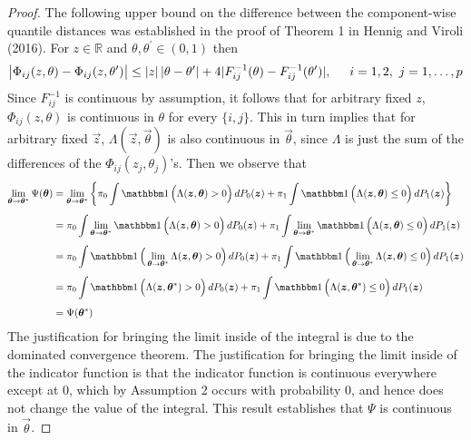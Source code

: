 \begin{proof}
  The following upper bound on the difference between the component-wise
  quantile distances was established in the proof of Theorem 1 in Hennig and
  Viroli (2016).  For $z \in \mathbb{R}$ and
  $\theta, \theta^{\prime} \in (0, 1)$ then
  \begin{equation}
    \label{eq:quantile-distance-ubnd}
    \big| \Phi_{ij}(z, \theta) - \Phi_{ij}(z, \theta^{\prime}) \big|
    \leq |z|\, | \theta - \theta^{\prime} | +
    4 | F_{ij}^{-1}(\theta) - F_{ij}^{-1}(\theta^{\prime}) |,
    \hspace{5mm} i = 1, 2,~ j = 1, \dots, p
  \end{equation}
  Since $F_{ij}^{-1}$ is continuous by assumption, it follows that for arbitrary
  fixed $z$, $\Phi_{ij}(z, \theta)$ is continuous in $\theta$ for every
  $\{i, j\}$.  This in turn implies that for arbitrary fixed $\vec{z}$,
  $\Lambda(\vec{z}, \vec{\theta})$ is also continuous in $\vec{\theta}$, since
  $\Lambda$ is just the sum of the differences of the
  $\Phi_{ij}(z_j, \theta_j)$'s.  Then we observe that
  \begin{align}
    \label{eq:multivariate-phi-continuity}
    \begin{split}
      \limtheta \Psi(\vec{\theta})
      & = \limtheta \left\{
        \pi_0 \int \ind\Big( \Lambda(\vec{z}, \vec{\theta}) > 0 \Big)\, dP_0(\vec{z}) +
        \pi_1 \int \ind\Big(\Lambda(\vec{z}, \vec{\theta}) \leq 0 \Big)\, dP_1(\vec{z})
      \right\} \\[1ex]
      & = \pi_0 \int \limtheta \ind\Big( \Lambda(\vec{z}, \vec{\theta}) > 0 \Big)\, dP_0(\vec{z})
      + \pi_1 \int \limtheta \ind\Big(\Lambda(\vec{z}, \vec{\theta}) \leq 0 \Big)\, dP_1(\vec{z})
      \\[1ex]
      & = \pi_0 \int \ind \Big( \limtheta \Lambda(\vec{z}, \vec{\theta}) > 0 \Big)\, dP_0(\vec{z})
      + \pi_1 \int \ind \Big( \limtheta \Lambda(\vec{z}, \vec{\theta}) \leq 0 \Big)\, dP_1(\vec{z})
      \\[1ex]
      & = \pi_0 \int \ind \Big( \Lambda(\vec{z}, \vec{\theta}^{*}) > 0 \Big)\, dP_0(\vec{z})
      + \pi_1 \int \ind \Big( \Lambda(\vec{z}, \vec{\theta}^{*}) \leq 0 \Big)\, dP_1(\vec{z})
      \\[1ex]
      & = \Psi(\vec{\theta}^{*})
    \end{split}
  \end{align}
  The justification for bringing the limit inside of the integral is due to the
  dominated convergence theorem.  The justification for bringing the limit
  inside of the indicator function is that the indicator function is continuous
  everywhere except at 0, which by Assumption 2 occurs with probability 0, and
  hence does not change the value of the integral.  This result establishes that
  $\Psi$ is continuous in $\vec{\theta}$.


\end{proof}
